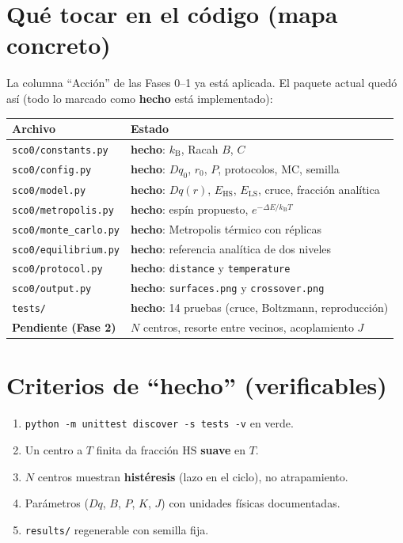 \documentclass[11pt,a4paper]{article}
\newcommand{\HS}{\mathrm{HS}}
\newcommand{\LS}{\mathrm{LS}}
\newcommand{\Dq}{Dq}
\newcommand{\kb}{k_{\mathrm{B}}}
\begin{document}
\section{Qué tocar en el código (mapa concreto)}

La columna ``Acción'' de las Fases 0--1 ya está aplicada. El paquete actual
quedó así (todo lo marcado como \textbf{hecho} está implementado):

\begin{center}
\begin{tabular}{ll}
\toprule
Archivo & Estado \\
\midrule
\texttt{sco0/constants.py} & \textbf{hecho}: $\kb$, Racah $B$, $C$ \\
\texttt{sco0/config.py} & \textbf{hecho}: $\Dq_0$, $r_0$, $P$, protocolos, MC, semilla \\
\texttt{sco0/model.py} & \textbf{hecho}: $\Dq(r)$, $E_{\HS}$, $E_{\LS}$, cruce, fracción analítica \\
\texttt{sco0/metropolis.py} & \textbf{hecho}: espín propuesto, $e^{-\Delta E/\kb T}$ \\
\texttt{sco0/monte\_carlo.py} & \textbf{hecho}: Metropolis térmico con réplicas \\
\texttt{sco0/equilibrium.py} & \textbf{hecho}: referencia analítica de dos niveles \\
\texttt{sco0/protocol.py} & \textbf{hecho}: \texttt{distance} y \texttt{temperature} \\
\texttt{sco0/output.py} & \textbf{hecho}: \texttt{surfaces.png} y \texttt{crossover.png} \\
\texttt{tests/} & \textbf{hecho}: 14 pruebas (cruce, Boltzmann, reproducción) \\
\midrule
\textbf{Pendiente (Fase 2)} & $N$ centros, resorte entre vecinos, acoplamiento $J$ \\
\bottomrule
\end{tabular}
\end{center}

\section{Criterios de ``hecho'' (verificables)}

\begin{enumerate}
\item \texttt{python -m unittest discover -s tests -v} en verde.
\item Un centro a $T$ finita da fracción $\HS$ \textbf{suave} en $T$.
\item $N$ centros muestran \textbf{histéresis} (lazo en el ciclo), no atrapamiento.
\item Parámetros ($\Dq$, $B$, $P$, $K$, $J$) con unidades físicas documentadas.
\item \texttt{results/} regenerable con semilla fija.
\end{enumerate}
\end{document}
